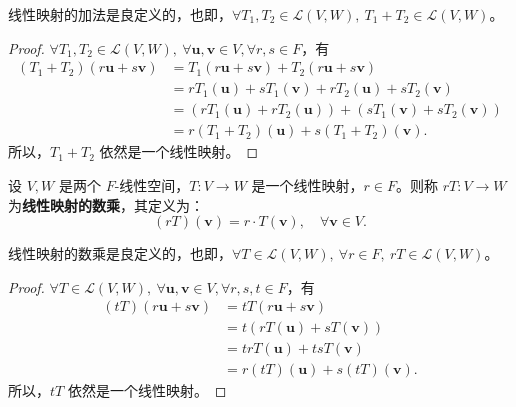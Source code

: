\begin{proposition}
    线性映射的加法是良定义的，也即，$\forall T_1,T_2\in \mathcal{L}(V,W),\ T_1+T_2\in \mathcal{L}(V,W)$。
\end{proposition}
\begin{proof}
    $\forall T_1,T_2\in \mathcal{L}(V,W),\ \forall \mathbf{u},\mathbf{v}\in V, \forall r,s \in F$，有
    \begin{align*}
        (T_1+T_2)(r\mathbf{u}+s\mathbf{v}) &= T_1(r\mathbf{u}+s\mathbf{v}) + T_2(r\mathbf{u}+s\mathbf{v}) \\
        &= rT_1(\mathbf{u}) + sT_1(\mathbf{v}) + rT_2(\mathbf{u}) + sT_2(\mathbf{v}) \\
        &= (rT_1(\mathbf{u}) + rT_2(\mathbf{u})) + (sT_1(\mathbf{v}) + sT_2(\mathbf{v})) \\
        &= r(T_1+T_2)(\mathbf{u}) + s(T_1+T_2)(\mathbf{v}).
    \end{align*}
    所以，$T_1+T_2$ 依然是一个线性映射。
\end{proof}

\begin{definition}[线性映射的数乘]
    设 $V,W$ 是两个 $F$-线性空间，$T:V\to W$ 是一个线性映射，$r\in F$。则称 $rT:V\to W$ 为\textbf{线性映射的数乘}，其定义为：
    \[
        (rT)(\mathbf{v}) = r\cdot T(\mathbf{v}), \quad \forall \mathbf{v}\in V.
    \]
\end{definition}

\begin{proposition}
    线性映射的数乘是良定义的，也即，$\forall T\in \mathcal{L}(V,W),\ \forall r\in F,\ rT\in \mathcal{L}(V,W)$。
\end{proposition}

\begin{proof}
    $\forall T\in \mathcal{L}(V,W),\ \forall \mathbf{u},\mathbf{v}\in V, \forall r,s,t \in F$，有
    \begin{align*}
        (tT)(r\mathbf{u}+s\mathbf{v}) &= tT(r\mathbf{u}+s\mathbf{v}) \\
        &= t(rT(\mathbf{u}) + sT(\mathbf{v})) \\
        &= trT(\mathbf{u}) + tsT(\mathbf{v}) \\
        &= r(tT)(\mathbf{u}) + s(tT)(\mathbf{v}).
    \end{align*}
    所以，$tT$ 依然是一个线性映射。
\end{proof}

